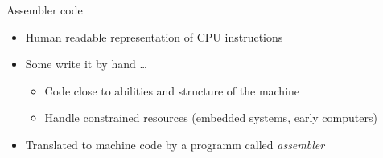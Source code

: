 \begin{frame}[fragile]{Assembler code}

  \begin{itemize}
    \tightlist
  \item
    Human readable representation of CPU instructions
  \item
    Some write it by hand \ldots{}

    \begin{itemize}
      \tightlist
    \item
      Code close to abilities and structure of the machine
    \item
      Handle constrained resources (embedded systems, early computers)
    \end{itemize}
  \item
    Translated to machine code by a programm called \emph{assembler}
  \end{itemize}


\end{frame}

